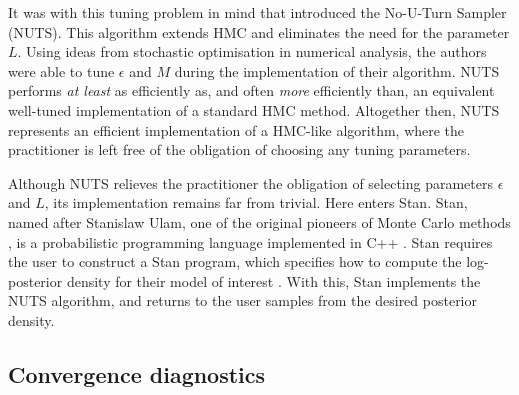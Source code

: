 It was with this tuning problem in mind that \textcite{hoffman14} introduced
the No-U-Turn Sampler (NUTS). This algorithm extends HMC and eliminates the
need for the parameter $L$. Using ideas from stochastic optimisation in
numerical analysis, the authors were able to tune $\epsilon$ and $M$ during the
implementation of their algorithm. NUTS performs \emph{at least} as efficiently
as, and often \emph{more} efficiently than, an equivalent well-tuned
implementation of a standard HMC method. Altogether then, NUTS represents an
efficient implementation of a HMC-like algorithm, where the practitioner is
left free of the obligation of choosing any tuning parameters. 

Although NUTS relieves the practitioner the obligation of selecting parameters
$\epsilon$ and $L$, its implementation remains far from trivial. Here enters
Stan. Stan, named after Stanislaw Ulam, one of the original pioneers of Monte
Carlo methods \parencite{metropolis49}, is a probabilistic programming language
implemented in C++ \parencite{gelman15}. Stan requires the user to construct a
Stan program, which specifies how to compute the log-posterior density for
their model of interest \parencite{stanteam15}. With this, Stan implements the
NUTS algorithm, and returns to the user samples from the desired posterior
density.

\subsection{Convergence diagnostics}
\label{ssec:convergence_diagnostics}

